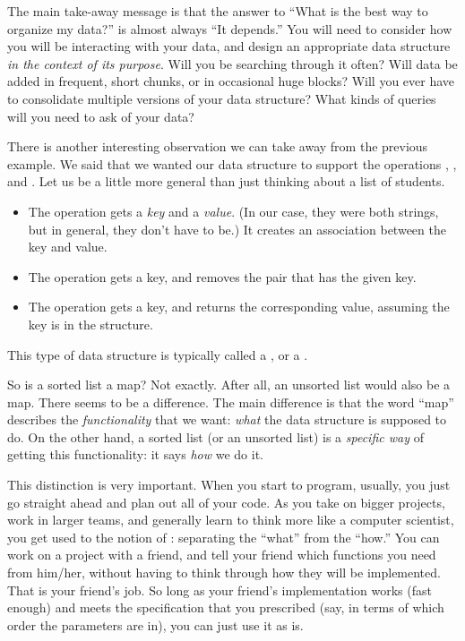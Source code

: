 The main take-away message is that the answer to ``What is the best
way to organize my data?'' is almost always ``It depends.'' 
You will need to consider how you will be interacting with your data,
and design an appropriate data structure \emph{in the context of its purpose}. 
Will you be searching through it often?
Will data be added in frequent, short chunks, or in occasional huge blocks?
Will you ever have to consolidate multiple versions of your data structure?
What kinds of queries will you need to ask of your data?

\medskip

There is another interesting observation we can take away from the previous
example. We said that we wanted our data structure to support
the operations , , and .
Let us be a little more general than just thinking about a list of students.
\begin{itemize}
\item The  operation gets a \emph{key} and a
  \emph{value}. (In our case, they were both strings, but in general,
  they don't have to be.)
  It creates an association between the key and value.
\item The  operation gets a key, and removes the
  pair that has the given key.
\item The  operation gets a key, and returns the
  corresponding value, assuming the key is in the structure.
\end{itemize}
This type of data structure is typically called a ,
or a .

So is a sorted list a map? Not exactly.
After all, an unsorted list would also be a map.
There seems to be a difference.
The main difference is that the word ``map'' describes the
\emph{functionality} that we want:
\emph{what} the data structure is supposed to do.
On the other hand, a sorted list (or an unsorted list) is a
\emph{specific way} of getting this functionality:
it says \emph{how} we do it. 

This distinction is very important. When you start to program,
usually, you just go straight ahead and plan out all of your code.
As you take on bigger projects, work in larger teams, and generally
learn to think more like a computer scientist, you get used to the 
notion of : separating the ``what'' from the ``how.''
You can work on a project with a friend, and tell your friend
which functions you need from him/her, without having to think through
how they will be implemented. That is your friend's job.
So long as your friend's implementation works (fast enough) and meets
the specification that you prescribed (say, in terms of which order
the parameters are in), you can just use it as is.

